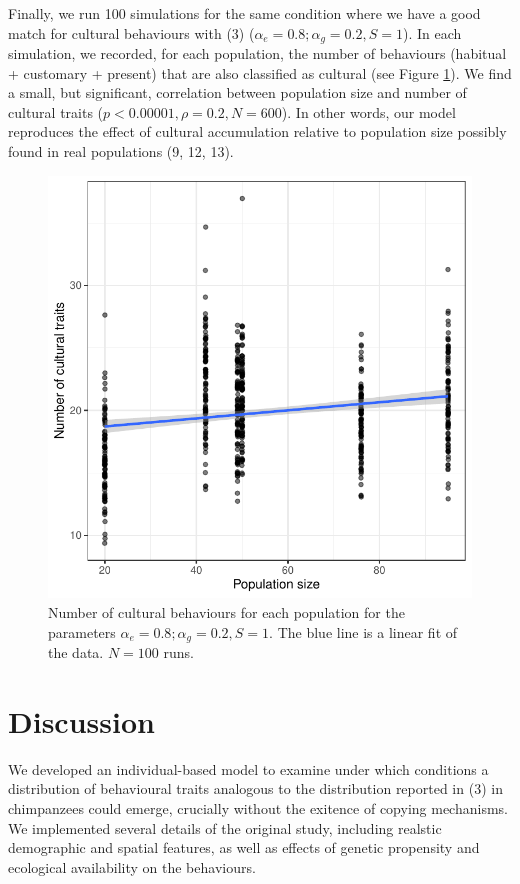 \documentclass[9pt,twocolumn,twoside,]{pnas-new}
\begin{document}
Finally, we run 100 simulations for the same condition where we have a
good match for cultural behaviours with (3)
(\(\alpha_e=0.8;\alpha_g=0.2, S=1\)). In each simulation, we recorded,
for each population, the number of behaviours (habitual + customary +
present) that are also classified as cultural (see Figure
\ref{Figure4}). We find a small, but significant, correlation between
population size and number of cultural traits
(\(p<0.00001,\rho=0.2,N=600\)). In other words, our model reproduces the
effect of cultural accumulation relative to population size possibly
found in real populations (9, 12, 13).

\begin{figure}[h!]
\begin{center}
\includegraphics[width=11.4cm]{figures/figure_4.pdf}
\caption{Number of cultural behaviours for each population for the parameters $\alpha_e=0.8;\alpha_g=0.2,S=1$. The blue line is a linear fit of the data. $N=100$ runs.}
\label{Figure4}
\end{center}
\end{figure}

\section*{Discussion}\label{discussion}

We developed an individual-based model to examine under which conditions
a distribution of behavioural traits analogous to the distribution
reported in (3) in chimpanzees could emerge, crucially without the
exitence of copying mechanisms. We implemented several details of the
original study, including realstic demographic and spatial features, as
well as effects of genetic propensity and ecological availability on the
behaviours.
\end{document}
